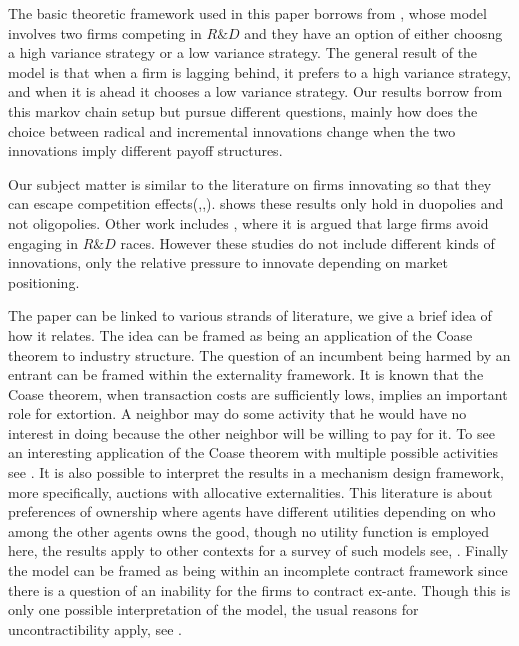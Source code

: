 \documentclass[11pt]{article}
\begin{document}



The basic theoretic framework used in this paper borrows from \cite{Cabral2003}, whose model involves two firms competing in $R\&D$ and they have an option of either choosng a high variance strategy or a low variance strategy. The general result of the model is that when a firm is lagging behind, it prefers to a high variance strategy, and when it is ahead it chooses a low variance strategy. Our results borrow from this markov chain setup but pursue different questions, mainly how does the choice between radical and incremental innovations change when the two innovations imply different payoff structures.

Our subject matter is similar to the literature on firms innovating so that they can escape competition effects(\cite{Aghion2005},\cite{Aghion2001},\cite{Aghion1997}). \cite{Gilbert2016} shows these results only hold in duopolies and not oligopolies. Other work includes \cite{Phillips2012}, where it is argued that large firms avoid engaging in $R\&D$ races. However these studies do not include different kinds of innovations, only the relative pressure to innovate depending on market positioning. 

The paper can be linked to various strands of literature, we give a brief idea of how it relates. The idea can be framed as being an application of the Coase theorem to industry structure. The question of an incumbent being harmed by an entrant can be framed within the externality framework. It is known that the Coase theorem, when transaction costs are sufficiently lows, implies an important role for extortion. A neighbor may do some activity that he would have no interest in doing because the other neighbor will be willing to pay for it. To see an interesting application of the Coase theorem with multiple possible activities see \cite{Kuechle2012}. It is also possible to interpret the results in a mechanism design framework, more specifically, auctions with allocative externalities. This literature is about preferences of ownership where agents have different utilities depending on who among the other agents owns the good, though no utility function is employed here, the results apply to other contexts for a survey of such models see, \cite{Jehiel2005}. Finally the model can be framed as being within an incomplete contract framework since there is a question of an inability for the firms to contract ex-ante. Though this is only one possible interpretation of the model, the usual reasons for uncontractibility apply, see \cite{hart1999}.
\end{document}

